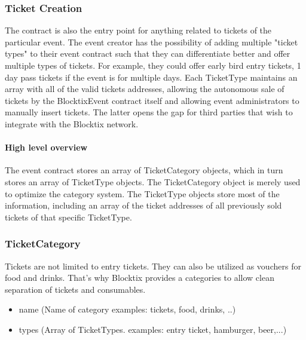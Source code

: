 \documentclass[a4paper]{article}
\begin{document}
\subsubsection{Ticket Creation}
The contract is also the entry point for anything related to tickets of the particular event. The event creator has the possibility of adding multiple "ticket types" to their event contract such that they can differentiate better and offer multiple types of tickets. For example, they could offer early bird entry tickets, 1 day pass tickets if the event is for multiple days. Each TicketType maintains an array with all of the valid tickets addresses, allowing the autonomous sale of tickets by the BlocktixEvent contract itself and allowing event administrators to manually insert tickets. The latter opens the gap for third parties that wish to integrate with the Blocktix network. 

\paragraph{High level overview}
The event contract stores an array of TicketCategory objects, which in turn stores an array of TicketType objects. The TicketCategory object is merely used to optimize the category system. The TicketType objects store most of the information, including an array of the ticket addresses of all previously sold tickets of that specific TicketType. 

\subsubsection{TicketCategory} Tickets are not limited to entry tickets. They can also be utilized as vouchers for food and drinks. That's why Blocktix provides a categories to allow clean separation of tickets and consumables. 
\begin{itemize}
\item name (Name of category examples: tickets, food, drinks, ..)
\item types (Array of TicketTypes. examples: entry ticket, hamburger, beer,...)
\end{itemize}
\end{document}
